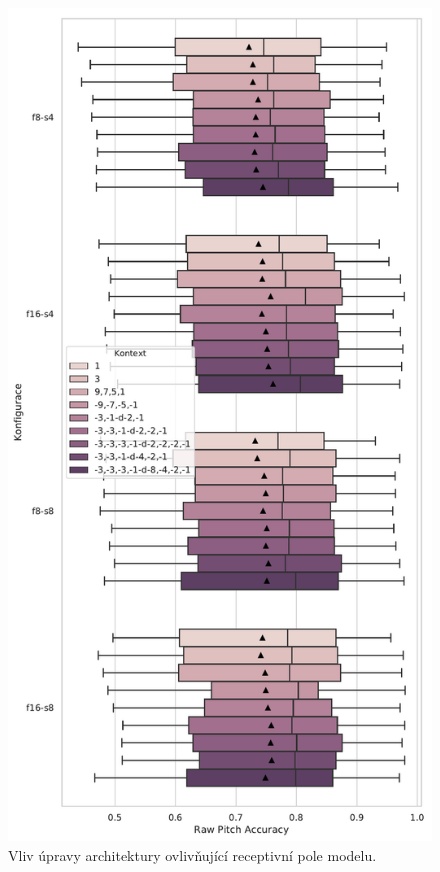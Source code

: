 \begin{figure}[h]\centering
    \includegraphics[scale=0.6]{../img/figures/spectrogram_ctx_archs}
\caption{Vliv úpravy architektury ovlivňující receptivní pole modelu.}\label{obr:spectrogram_ctx_archs}
\end{figure}


